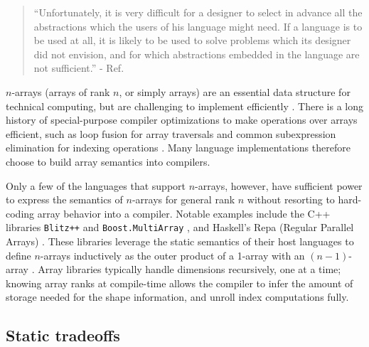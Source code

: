 \documentclass[preprint]{sigplanconf}
\newcommand{\code}[1]{\texttt{#1}}
\begin{document}
\begin{quotation}
``Unfortunately, it is very difficult for a designer to select in advance all
the abstractions which the users of his language might need. If a language is
to be used at all, it is likely to be used to solve problems which its
designer did not envision, and for which abstractions embedded in the language
are not sufficient.'' - Ref. \cite{Liskov:1974pb}
\end{quotation}

$n$-arrays (arrays of rank $n$, or simply arrays) are an essential data
structure for technical computing, but are challenging to implement
efficiently \cite{Sattley:1960as,Sattley:1961as,Randell:1964a6}. There is a
long history of special-purpose compiler optimizations to make operations over
arrays efficient, such as loop fusion for array traversals and common
subexpression elimination for indexing operations \cite{Randell:1964a6,
Busam:1969oe}. Many language implementations therefore choose to build array
semantics into compilers.

Only a few of the languages that support $n$-arrays, however, have sufficient
power to express the semantics of $n$-arrays for general rank $n$ without
resorting to hard-coding array behavior into a compiler.
Notable examples include the C++ libraries 
\code{Blitz++} \cite{Veldhuizen:1998ab} and \code{Boost.MultiArray}
\cite{Garcia:2005ma}, and Haskell's Repa (Regular Parallel Arrays)
\cite{Keller:2010rs,Lippmeier:2011ep, Lippmeier:2012gp}. These libraries
leverage the static semantics of their host languages to
define $n$-arrays inductively as the outer product of a 1-array with an
$(n\!\!-\!\!1)$-array \cite{Bavestrelli:2000ct}.
Array libraries typically handle dimensions recursively, one at a time;
knowing array ranks at compile-time allows the compiler to infer the amount
of storage needed for the shape information, and unroll index computations fully.


\subsection{Static tradeoffs}
\end{document}
